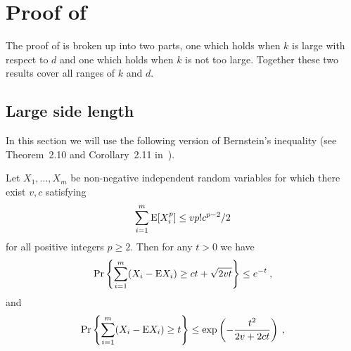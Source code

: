 \documentclass{patmorin}
\newcommand{\abas}[1]{\textcolor{orange}{\big[Abbas: #1\big]}}
\begin{document}
%

\section{Proof of }

The proof of  is broken up into two parts,
one which holds when $k$ is large with respect to $d$ and one which
holds when $k$ is not too large.  Together these two results cover all ranges of $k$ and $d$.  


\subsection{Large side length}

In this section we will use the following version of
Bernstein's inequality (see Theorem~2.10 and Corollary~2.11
in~\cite{boucheron2013concentration}).


\begin{thm}
\label{thm:bernstein}
Let $X_1,\dots,X_m$ be non-negative independent random variables for which there exist $v,c$ satisfying
\[\sum_{i=1}^m \mathrm{E} [X_i^p] \leq v p!  c^{p-2}/2\]
for all positive integers $p\geq2$.
Then for any $t>0$ we have
\[
\Pr \left\{ \sum_{i=1}^m (X_i - \mathrm{E} X_i) \geq ct + \sqrt{2vt}\right\}\leq e^{-t} \:,
\]
and
\[
\Pr \left\{ \sum_{i=1}^m (X_i - \mathrm{E} X_i) \geq t
\right\}\leq \exp\left(-\frac{t^2}{2v+2ct}\right) \:,
\]
\end{thm}
\end{document}
